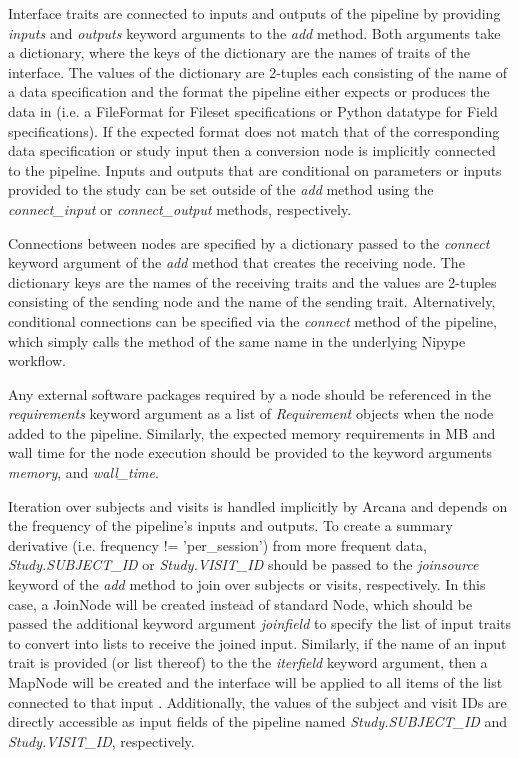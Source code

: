 \documentclass[smallextended]{svjour3}       %
\begin{document}
Interface traits are connected to inputs and outputs of the pipeline by
providing \emph{inputs} and \emph{outputs} keyword arguments to the \emph{add} method. Both
arguments take a dictionary, where the keys of the dictionary are the names of traits of the interface. The
values of the dictionary are 2-tuples each consisting of the name of a data specification
and the format the pipeline either expects or produces the data in (i.e. a FileFormat for Fileset specifications
or Python datatype for Field specifications). If the expected format does not match that of the
corresponding data specification or study input then a conversion node is implicitly connected
to the pipeline. Inputs and outputs that are conditional on parameters or inputs provided to the
study can be set outside of the \emph{add} method using the \emph{connect\_input} or
\emph{connect\_output} methods, respectively.

Connections between nodes are specified by a dictionary
passed to the \emph{connect} keyword argument of the \emph{add} method
that creates the receiving node. The dictionary keys are the names of the
receiving traits and the values are 2-tuples
consisting of the sending node and the name of the sending trait. Alternatively,
conditional connections can be specified via the \emph{connect} method of the
pipeline, which simply calls the method of the same name in the underlying
Nipype workflow.

Any external software packages required by a node should be referenced
in the \emph{requirements} keyword argument as a list of
\emph{Requirement} objects when the node added to the pipeline.
Similarly, the expected memory requirements in MB and
wall time for the node execution should be provided to the keyword arguments
\emph{memory}, and \emph{wall\_time}.

Iteration over subjects and visits is handled implicitly by Arcana and
depends on the frequency of the pipeline's inputs and outputs. To create
a summary derivative (i.e. frequency != 'per\_session') from more frequent
data, \emph{Study.SUBJECT\_ID} or \emph{Study.VISIT\_ID} should be
passed to the \emph{joinsource} keyword of the \emph{add} method to join over subjects or visits, respectively.
In this case, a JoinNode will be created instead of standard Node,
which should be passed the additional keyword argument \emph{joinfield} to
specify the list of input traits to convert into lists to receive the joined input.
Similarly, if the name of an input trait is provided (or list thereof) to the the \emph{iterfield}
keyword argument, then a MapNode will be created and the interface will
be applied to all items of the list connected to that input \citep{gorgolewski_nipype:_2011}.
Additionally, the values of the subject and visit IDs are directly accessible as input fields of the pipeline
named \emph{Study.SUBJECT\_ID} and \emph{Study.VISIT\_ID}, respectively.
\end{document}
